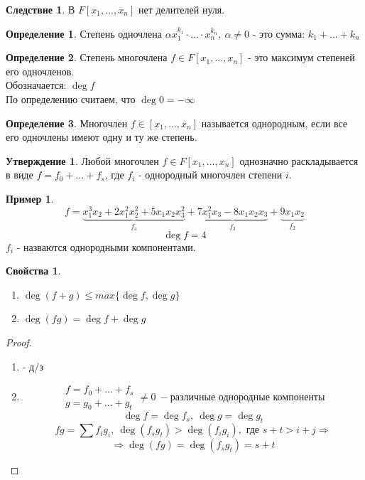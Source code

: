 \documentclass[a4paper, 12pt]{article}
\newcommand\tab[1][.5cm]{\hspace*{#1}}
\theoremstyle{definition}
\newtheorem*{definition}{Определение}
\newtheorem*{consequense}{Следствие}
\newtheorem*{subtheorem}{Утверждение}
\newtheorem*{example1}{Пример}
\newtheorem*{properties}{Свойства}
\begin{document}
  \begin{consequense}
    В $F[x_1,...,x_n]$ нет делителей нуля. 
  \end{consequense}
  \begin{definition}
    Степень одночлена $\alpha x_1^{k_1} \cdot ... \cdot x_n^{k_n}, \ \alpha \neq 0$ - это сумма: $k_1+...+k_n$   
  \end{definition}
  \begin{definition}
    Степень многочлена $f \in F[x_1,...,x_n]$ - это максимум степеней его одночленов.\\
    Обозначается: $\deg f$\\
    По определению считаем, что $\deg 0 = -\infty$   
  \end{definition}
  \begin{definition}
    Многочлен $f \in [x_1,...,x_n]$ называется однородным, если все его одночлены имеют одну и ту же степень. 
  \end{definition}
  \begin{subtheorem}
    Любой многочлен $f \in F[x_1,...,x_n]$ однозначно раскладывается в виде $f = f_0+...+f_s$, где $f_i$ - однородный многочлен степени $i$.   
  \end{subtheorem}
  \begin{example1}
    $$f= \underbrace{x_1^3x_2+2x_1^2x_2^2 + 5x_1x_2x_3^2}_{f_4}  + \underbrace{7x_1^2x_3 - 8x_1x_2x_3}_{f_3} + \underbrace{9x_1x_2}_{f_2}$$
    $$\deg f = 4$$
    $f_i$ - назваются однородными компонентами.   
  \end{example1}
  \begin{properties}\tab
    \begin{enumerate}
      \item $\deg (f+g) \leq max \{\deg f, \deg g\}$
      \item $\deg (fg) = \deg f + \deg g$ 
    \end{enumerate}
  \end{properties}
  \begin{proof}\tab
    \begin{enumerate}
      \item - д/з
      \item 
        $$\begin{matrix}
          f = f_0+...+f_s\\
          g = g_0+...+g_t
        \end{matrix} \neq 0 \ - \text{различные однородные компоненты}$$
        $$\deg f = \deg f_s, \ \deg g = \deg g_t$$
        $$fg = \sum f_ig_i, \ \deg (f_sg_t) > \deg (f_ig_i), \text{ где } s+t > i+j \Longrightarrow $$
        $$\Longrightarrow \deg (fg) = \deg (f_sg_t) = s+t$$    
    \end{enumerate}
  \end{proof}
\end{document}
